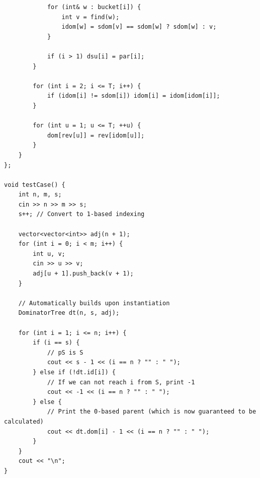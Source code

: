 \documentclass[9pt,a4paper,twocolumn]{extarticle}
\begin{document}
\begin{lstlisting}
            for (int& w : bucket[i]) {
                int v = find(w);
                idom[w] = sdom[v] == sdom[w] ? sdom[w] : v;
            }

            if (i > 1) dsu[i] = par[i];
        }

        for (int i = 2; i <= T; i++) {
            if (idom[i] != sdom[i]) idom[i] = idom[idom[i]];
        }

        for (int u = 1; u <= T; ++u) {
            dom[rev[u]] = rev[idom[u]];
        }
    }
};

void testCase() {
    int n, m, s;
    cin >> n >> m >> s;
    s++; // Convert to 1-based indexing

    vector<vector<int>> adj(n + 1);
    for (int i = 0; i < m; i++) {
        int u, v;
        cin >> u >> v;
        adj[u + 1].push_back(v + 1);
    }

    // Automatically builds upon instantiation
    DominatorTree dt(n, s, adj);

    for (int i = 1; i <= n; i++) {
        if (i == s) {
            // pS is S
            cout << s - 1 << (i == n ? "" : " ");
        } else if (!dt.id[i]) {
            // If we can not reach i from S, print -1
            cout << -1 << (i == n ? "" : " ");
        } else {
            // Print the 0-based parent (which is now guaranteed to be calculated)
            cout << dt.dom[i] - 1 << (i == n ? "" : " ");
        }
    }
    cout << "\n";
}
\end{lstlisting}

\filbreak
\end{document}
